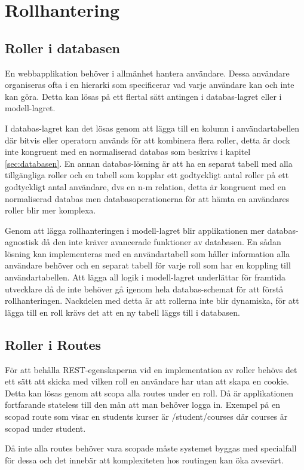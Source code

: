 \section{Rollhantering}

\subsection{Roller i databasen}

En webbapplikation behöver i allmänhet hantera användare. Dessa användare organiseras ofta i en hierarki som specificerar vad varje användare kan och inte kan göra. Detta kan lösas på ett flertal sätt antingen i databas-lagret eller i modell-lagret.

I databas-lagret kan det lösas genom att lägga till en kolumn i användartabellen där bitvis eller 
operatorn används för att kombinera flera roller, detta är dock inte kongruent med en normaliserad databas som beskrivs i kapitel \ref{sec:databasen}. En annan databas-lösning är att ha en separat tabell med alla tillgängliga roller och en tabell som kopplar ett godtyckligt antal roller på ett godtyckligt antal användare, dvs en n-m relation, detta är kongruent med en normaliserad databas men databasoperationerna för att hämta en användares roller blir mer komplexa.

Genom att lägga rollhanteringen i modell-lagret blir applikationen mer databas-agnostisk då den inte kräver avancerade funktioner av databasen. En sådan lösning kan implementeras med en användartabell som håller information alla användare behöver och en separat tabell för varje roll som har en koppling till användartabellen. Att lägga all logik i modell-lagret underlättar för framtida utvecklare då de inte behöver gå igenom hela databas-schemat för att förstå rollhanteringen. Nackdelen med detta är att rollerna inte blir dynamiska, för att lägga till en roll krävs det att en ny tabell läggs till i databasen.

\subsection{Roller i Routes}

För att behålla REST-egenskaperna vid en implementation av roller behövs det ett sätt att skicka med vilken roll en användare har utan att skapa en cookie. Detta kan lösas genom att scopa alla routes under en roll. Då är applikationen fortfarande stateless till den mån att man behöver logga in. 
Exempel på en scopad route som visar en students kurser är /student/courses där courses är scopad under student.

Då inte alla routes behöver vara scopade måste systemet byggas med specialfall för dessa och det innebär att komplexiteten hos routingen kan öka avsevärt.
